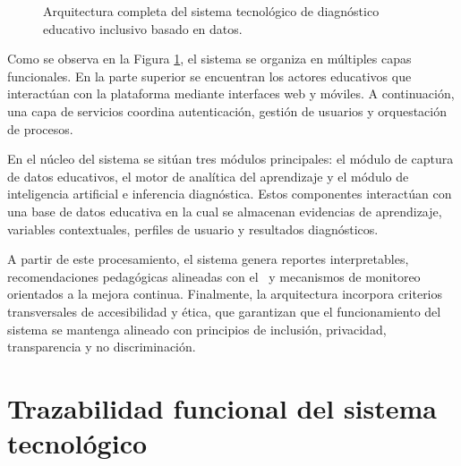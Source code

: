 \begin{refsection}
\begin{figure}[htbp]
{
}
\caption{Arquitectura completa del sistema tecnológico de diagnóstico educativo inclusivo basado en datos.}
\label{fig:arquitectura-completa-sistema}
\end{figure}

Como se observa en la Figura \ref{fig:arquitectura-completa-sistema}, el sistema se organiza en múltiples capas funcionales. En la parte superior se encuentran los actores educativos que interactúan con la plataforma mediante interfaces web y móviles. A continuación, una capa de servicios coordina autenticación, gestión de usuarios y orquestación de procesos.

En el núcleo del sistema se sitúan tres módulos principales: el módulo de captura de datos educativos, el motor de analítica del aprendizaje y el módulo de inteligencia artificial e inferencia diagnóstica. Estos componentes interactúan con una base de datos educativa en la cual se almacenan evidencias de aprendizaje, variables contextuales, perfiles de usuario y resultados diagnósticos.

A partir de este procesamiento, el sistema genera reportes interpretables, recomendaciones pedagógicas alineadas con el \DUA\ y mecanismos de monitoreo orientados a la mejora continua. Finalmente, la arquitectura incorpora criterios transversales de accesibilidad y ética, que garantizan que el funcionamiento del sistema se mantenga alineado con principios de inclusión, privacidad, transparencia y no discriminación.


\section{Trazabilidad funcional del sistema tecnológico}


\end{refsection}
